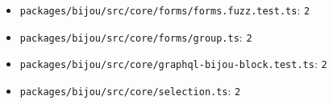 \begin{itemize}
\item
  \texttt{p\allowbreak{}a\allowbreak{}c\allowbreak{}k\allowbreak{}a\allowbreak{}g\allowbreak{}e\allowbreak{}s\allowbreak{}/\allowbreak{}b\allowbreak{}i\allowbreak{}j\allowbreak{}o\allowbreak{}u\allowbreak{}/\allowbreak{}s\allowbreak{}r\allowbreak{}c\allowbreak{}/\allowbreak{}c\allowbreak{}o\allowbreak{}r\allowbreak{}e\allowbreak{}/\allowbreak{}f\allowbreak{}o\allowbreak{}r\allowbreak{}m\allowbreak{}s\allowbreak{}/\allowbreak{}f\allowbreak{}o\allowbreak{}r\allowbreak{}m\allowbreak{}s\allowbreak{}.\allowbreak{}f\allowbreak{}u\allowbreak{}z\allowbreak{}z\allowbreak{}.\allowbreak{}t\allowbreak{}e\allowbreak{}s\allowbreak{}t\allowbreak{}.\allowbreak{}t\allowbreak{}s}: \texttt{2}
\item
  \texttt{p\allowbreak{}a\allowbreak{}c\allowbreak{}k\allowbreak{}a\allowbreak{}g\allowbreak{}e\allowbreak{}s\allowbreak{}/\allowbreak{}b\allowbreak{}i\allowbreak{}j\allowbreak{}o\allowbreak{}u\allowbreak{}/\allowbreak{}s\allowbreak{}r\allowbreak{}c\allowbreak{}/\allowbreak{}c\allowbreak{}o\allowbreak{}r\allowbreak{}e\allowbreak{}/\allowbreak{}f\allowbreak{}o\allowbreak{}r\allowbreak{}m\allowbreak{}s\allowbreak{}/\allowbreak{}g\allowbreak{}r\allowbreak{}o\allowbreak{}u\allowbreak{}p\allowbreak{}.\allowbreak{}t\allowbreak{}s}: \texttt{2}
\item
  \texttt{p\allowbreak{}a\allowbreak{}c\allowbreak{}k\allowbreak{}a\allowbreak{}g\allowbreak{}e\allowbreak{}s\allowbreak{}/\allowbreak{}b\allowbreak{}i\allowbreak{}j\allowbreak{}o\allowbreak{}u\allowbreak{}/\allowbreak{}s\allowbreak{}r\allowbreak{}c\allowbreak{}/\allowbreak{}c\allowbreak{}o\allowbreak{}r\allowbreak{}e\allowbreak{}/\allowbreak{}g\allowbreak{}r\allowbreak{}a\allowbreak{}p\allowbreak{}h\allowbreak{}q\allowbreak{}l\allowbreak{}-\allowbreak{}b\allowbreak{}i\allowbreak{}j\allowbreak{}o\allowbreak{}u\allowbreak{}-\allowbreak{}b\allowbreak{}l\allowbreak{}o\allowbreak{}c\allowbreak{}k\allowbreak{}.\allowbreak{}t\allowbreak{}e\allowbreak{}s\allowbreak{}t\allowbreak{}.\allowbreak{}t\allowbreak{}s}: \texttt{2}
\item
  \texttt{p\allowbreak{}a\allowbreak{}c\allowbreak{}k\allowbreak{}a\allowbreak{}g\allowbreak{}e\allowbreak{}s\allowbreak{}/\allowbreak{}b\allowbreak{}i\allowbreak{}j\allowbreak{}o\allowbreak{}u\allowbreak{}/\allowbreak{}s\allowbreak{}r\allowbreak{}c\allowbreak{}/\allowbreak{}c\allowbreak{}o\allowbreak{}r\allowbreak{}e\allowbreak{}/\allowbreak{}s\allowbreak{}e\allowbreak{}l\allowbreak{}e\allowbreak{}c\allowbreak{}t\allowbreak{}i\allowbreak{}o\allowbreak{}n\allowbreak{}.\allowbreak{}t\allowbreak{}s}: \texttt{2}

\end{itemize}
